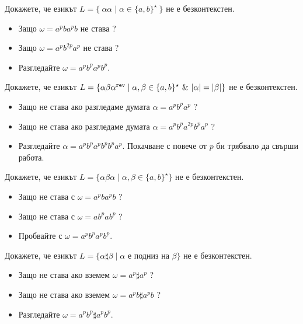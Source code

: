 \begin{extra}
\begin{problem}
  Докажете, че езикът $L = \{\ \alpha\alpha\mid \alpha\in \{a,b\}^\star\ \}$ не е безконтекстен.
\end{problem}
\begin{hint}
  \begin{itemize}
  \item 
    Защо $\omega = a^pba^pb$ не става ?
  \item
    Защо $\omega = a^pb^{2p}a^p$ не става ?
  \item
    Разгледайте $\omega = a^pb^pa^pb^p$.
  \end{itemize}
\end{hint}


\begin{problem}
  Докажете, че езикът $L = \{\alpha\beta\alpha^{\rev} \mid \alpha,\beta \in \{a,b\}^\star\ \&\ |\alpha| = |\beta|\}$ не е безконтекстен.
\end{problem}
\begin{hint}
  \begin{itemize}
  \item
    Защо не става ако разгледаме думата $\alpha = a^pb^pa^p$ ?
  \item 
    Защо не става ако разгледаме думата $\alpha = a^p b^p a^{2p} b^p a^p$ ?
  \item
    Разгледайте $\alpha = a^p b^p a^p b^p b^p a^p$.
    Покачване с повече от $p$ би трябвало да свърши работа.
  \end{itemize}
\end{hint}

\begin{problem}
  Докажете, че езикът $L = \{\alpha\beta\alpha \mid \alpha,\beta \in \{a,b\}^\star\}$ не е безконтекстен.
\end{problem}
\begin{hint}
  \begin{itemize}
  \item 
    Защо не става с $\omega = a^pba^pb$ ?
  \item
    Защо не става с $\omega = ab^pab^p$ ?
  \item
    Пробвайте с $\omega = a^pb^pa^pb^p$.
  \end{itemize}
\end{hint}

\begin{problem}
  Докажете, че езикът $L = \{\alpha\sharp\beta \mid \alpha\text{ е подниз на }\beta\}$ не е безконтекстен.
\end{problem}
\begin{hint}
  \begin{itemize}
  \item 
    Защо не става ако вземем $\omega = a^p \sharp a^p$ ?
  \item 
    Защо не става ако вземем $\omega = a^pb \sharp a^pb$ ?
  \item
    Разгледайте $\omega = a^pb^p\sharp a^pb^p$.
  \end{itemize}
\end{hint}



\end{extra}
